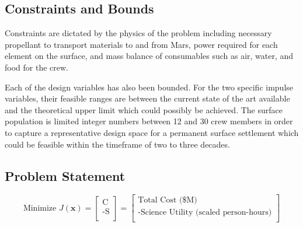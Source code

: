 \documentclass[]{aiaa-pretty}
\begin{document}
\subsection{Constraints and Bounds}
\label{sec:constraints}
Constraints are dictated by the physics of the problem including necessary propellant to transport materials to and from Mars, power required for each element on the surface, and mass balance of consumables such as air, water, and food for the crew. 

Each of the design variables has also been bounded. For the two specific impulse variables, their feasible ranges are between the current state of the art available and the theoretical upper limit which could possibly be achieved. The surface population is limited integer numbers between 12 and 30 crew members in order to capture a representative design space for a permanent surface settlement which could be feasible within the timeframe of two to three decades.

\subsection{Problem Statement}
\begin{equation*}
\mbox{Minimize } J(\mathbf{x})
=
\begin{bmatrix}
\mbox{C}\\
\mbox{-S}\\
\end{bmatrix}
=
\begin{bmatrix}
\mbox{Total Cost (\$M)}\\
\mbox{-Science Utility (scaled person-hours)}\\
\end{bmatrix}
\end{equation*}
\end{document}
